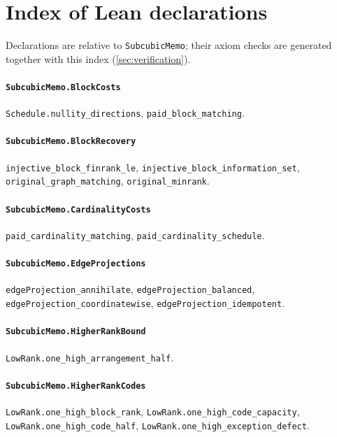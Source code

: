 \section{Index of Lean declarations}\label{sec:leanindex}

Declarations are relative to \texttt{SubcubicMemo}; their axiom checks are generated together with this index (\cref{sec:verification}).

\paragraph{\texttt{SubcubicMemo.BlockCosts}}
{\small\raggedright \texttt{Schedule.nullity\_directions}, \texttt{paid\_block\_matching}.\par}

\paragraph{\texttt{SubcubicMemo.BlockRecovery}}
{\small\raggedright \texttt{injective\_block\_finrank\_le}, \texttt{injective\_block\_information\_set}, \texttt{original\_graph\_matching}, \texttt{original\_minrank}.\par}

\paragraph{\texttt{SubcubicMemo.CardinalityCosts}}
{\small\raggedright \texttt{paid\_cardinality\_matching}, \texttt{paid\_cardinality\_schedule}.\par}

\paragraph{\texttt{SubcubicMemo.EdgeProjections}}
{\small\raggedright \texttt{edgeProjection\_annihilate}, \texttt{edgeProjection\_balanced}, \texttt{edgeProjection\_coordinatewise}, \texttt{edgeProjection\_idempotent}.\par}

\paragraph{\texttt{SubcubicMemo.HigherRankBound}}
{\small\raggedright \texttt{LowRank.one\_high\_arrangement\_half}.\par}

\paragraph{\texttt{SubcubicMemo.HigherRankCodes}}
{\small\raggedright \texttt{LowRank.one\_high\_block\_rank}, \texttt{LowRank.one\_high\_code\_capacity}, \texttt{LowRank.one\_high\_code\_half}, \texttt{LowRank.one\_high\_exception\_defect}.\par}

